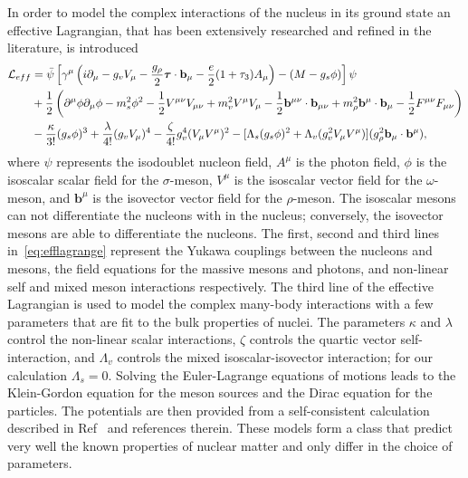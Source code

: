 In order to model the complex interactions of the nucleus in its ground state an effective Lagrangian, that has been extensively researched and refined in the literature, is introduced~\cite{todd:2003:relativistic, muller:1996:relativistic, utama:2016:nuclear} 
\begin{equation}\label{eq:efflagrange}
\begin{aligned}
\mathcal{L}_{eff} &= \bar{\psi} \left[ \gamma ^{\mu}\left( i\partial _{\mu} - g_v V_{\mu} - \frac{g_{\rho}}{2} \boldsymbol{\tau}\cdot \mathbf{b}_{\mu} - \frac{e}{2}(1+\tau _3)A_{\mu}\right) -(M-g_s\phi )\right]\psi 
\\
&+ \frac{1}{2} \left( \partial ^{\mu}\phi\partial _{\mu}\phi - m_s^2\phi ^2 - \frac{1}{2}V^{\mu\nu}V_{\mu\nu} +m_v^2 V^{\mu}V_{\mu} - \frac{1}{2} \mathbf{b}^{\mu\nu}\cdot\mathbf{b}_{\mu\nu} + m_{\rho}^2\mathbf{b}^{\mu}\cdot\mathbf{b}_{\mu}-\frac{1}{2}F^{\mu\nu}F_{\mu\nu}\right) 
\\
&- \frac{\kappa}{3!}(g_s\phi)^3+\frac{\lambda}{4!}(g_v V_{\mu})^4-\frac{\zeta}{4!}g_v^4(V_{\mu}V^{\mu})^2-[\Lambda _s (g_s\phi)^2 + \Lambda _v (g_v^2V_{\mu}V^{\mu})](g_{\rho}^2\mathbf{b}_{\mu}\cdot\mathbf{b}^{\mu}),
\end{aligned}
\end{equation}
where $\psi$ represents the isodoublet nucleon field, $A^{\mu}$ is the photon field, $\phi$ is the isoscalar scalar field for the $\sigma$-meson, $V^{\mu}$ is the isoscalar vector field for the $\omega$-meson, and $\mathbf{b}^{\mu}$ is the isovector vector field for the $\rho$-meson. The isoscalar mesons can not differentiate the nucleons with in the nucleus; conversely, the isovector mesons are able to differentiate the nucleons. The first, second and third lines in~\eqref{eq:efflagrange} represent the Yukawa couplings between the nucleons and mesons, the field equations for the massive mesons and photons, and non-linear self and mixed meson interactions respectively. The third line of the effective Lagrangian is used to model the complex many-body interactions with a few parameters that are fit to the bulk properties of nuclei. The parameters $\kappa$ and $\lambda$ control the non-linear scalar interactions, $\zeta$ controls the quartic vector self-interaction, and $\Lambda _v$ controls the mixed isoscalar-isovector interaction; for our calculation $\Lambda _s = 0$. Solving the Euler-Lagrange equations of motions leads to the Klein-Gordon equation for the meson sources and the Dirac equation for the particles. The potentials are then provided from a self-consistent calculation described in Ref~\cite{todd:2003:relativistic} and references therein. These models form a class that predict very well the known properties of nuclear matter and only differ in the choice of parameters. 

